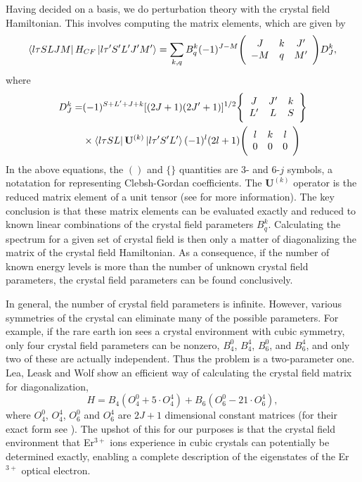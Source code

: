 \documentclass[12pt]{report}
\newcommand{\erbium}[1][ ]{Er$^{3+}$#1}
\begin{document}
Having decided on a basis, we do perturbation theory with the crystal field Hamiltonian. This involves computing the matrix elements, which are given by
\begin{equation}\label{eq:4}
  \bra{l\tau SLJM} H_{CF} \ket{l\tau' S'L'J'M'} = \sum_{k, q} B_{q}^{k}(-1)^{J-M}\Bigg(\begin{array}{c c c}J & k & J' \\ -M & q & M'\end{array}\Bigg)D_{J}^{k},
\end{equation}
where
\begin{align}
  D_{J}^{k} =
  & (-1)^{S+L'+J+k}[(2J+1)(2J'+1)]^{1/2}
    \Bigg\{\begin{array}{c c c} J & J' & k \\ L' & L & S \end{array}\Bigg\} \nonumber \\
  & \times \bra{l\tau S L } \mathbf{U}^{(k)}\ket{l\tau' S' L'}(-1)^{l}(2l + 1)
    \Bigg(\begin{array}{c c c} l & k & l \\ 0 & 0 & 0\end{array}\Bigg) \label{eq:5}                                                               
\end{align}
In the above equations, the $()$ and $\{\}$ quantities are 3- and 6-$j$ symbols, a notatation for representing Clebsh-Gordan coefficients. The $\mathbf{U}^{(k)}$ operator is the reduced matrix element of a unit tensor (see \cite{Wybourne1965} for more information). The key conclusion is that these matrix elements can be evaluated exactly and reduced to known linear combinations of the crystal field parameters $B_{q}^{k}$. Calculating the spectrum for a given set of crystal field is then only a matter of diagonalizing the matrix of the crystal field Hamiltonian. As a consequence, if the number of known energy levels is more than the number of unknown crystal field parameters, the crystal field parameters can be found conclusively.

In general, the number of crystal field parameters is infinite. However, various symmetries of the crystal can eliminate many of the possible parameters. For example, if the rare earth ion sees a crystal environment with cubic symmetry, only four crystal field parameters can be nonzero, $B_{4}^{0}$, $B_{4}^{4}$, $B_{6}^{0}$, and $B_{6}^{4}$, and only two of these are actually independent. Thus the problem is a two-parameter one. Lea, Leask and Wolf show an efficient way of calculating the crystal field matrix for diagonalization, 
\begin{equation}\label{eq:7}
  H = B_{4}(O_{4}^{0}+ 5\cdot O_{4}^{4}) + B_{6}(O_{6}^{0}-21\cdot O_{6}^{4}),
\end{equation}
where $O_{4}^{0}$, $O_{4}^{4}$, $O_{6}^{0}$ and $O_{6}^{4}$ are $2J+1$ dimensional constant matrices (for their exact form see \cite{Lea1962}). The upshot of this for our purposes is that the crystal field environment that \erbium ions experience in cubic crystals can potentially be determined exactly, enabling a complete description of the eigenstates of the \erbium optical electron. %
\end{document}
